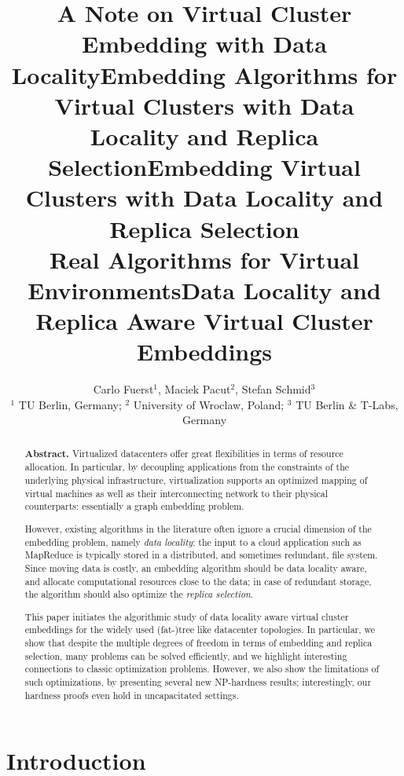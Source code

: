 \documentclass[9pt,twocolumn]{scrartcl}
\title{A Note on Virtual Cluster Embedding with Data Locality}
\title{Embedding Algorithms for Virtual Clusters with Data Locality and Replica Selection}
\title{Embedding Virtual Clusters with Data Locality and Replica Selection\\{\Large Real Algorithms for Virtual Environments}}
\title{Data Locality and Replica Aware Virtual Cluster Embeddings}
\author{Carlo Fuerst$^1$, Maciek Pacut$^2$, Stefan Schmid$^3$\\
{\small $^1$ TU Berlin, Germany; $^2$ University of Wroclaw, Poland; $^3$ TU Berlin \& T-Labs, Germany}}
\begin{document}
\maketitle


\begin{abstract}
\textbf{Abstract.} Virtualized datacenters offer great flexibilities in terms of resource allocation. In particular, by
decoupling applications from the constraints of the underlying physical infrastructure, virtualization
supports an optimized mapping of virtual machines as well as their interconnecting network
to their
physical counterparts: essentially a graph embedding problem.

However, existing algorithms
in the literature often ignore a crucial dimension of the embedding problem, namely \emph{data locality}:
the input to a cloud application such as MapReduce is typically stored in a distributed,
and sometimes redundant, file system. Since moving
data is costly, an embedding algorithm should be data locality aware,
and allocate computational resources close to the data; in case of redundant storage, the algorithm should also optimize the \emph{replica selection}.

This paper initiates the algorithmic study of data locality aware virtual cluster embeddings for
the widely used (fat-)tree like datacenter topologies.
In particular, we
show that
despite the multiple degrees of freedom in terms of embedding and replica selection,
many problems can be
solved efficiently, and we highlight interesting connections
to classic optimization problems. However, we also show the limitations of such optimizations,
by presenting several new NP-hardness results; interestingly,
our hardness proofs even hold in uncapacitated settings.
\end{abstract}

\section{Introduction}

\end{document}
